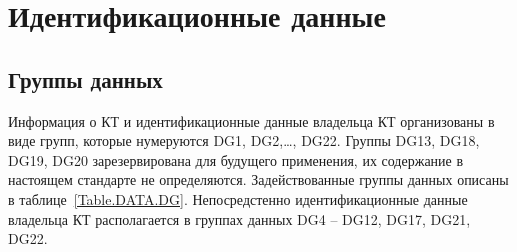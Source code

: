 \chapter{Идентификационные данные}\label{DATA}

\section{Группы данных}\label{DATA.DG}

Информация о КТ и идентификационные данные владельца КТ организованы в виде групп, 
которые нумеруются DG1, DG2,\ldots, DG22. 
Группы DG13, DG18, DG19, DG20 зарезервирована для будущего 
применения, их содержание в настоящем стандарте не определяются. 
Задействованные группы данных описаны в таблице~\ref{Table.DATA.DG}. 
Непосредстенно идентификационные данные владельца КТ располагается 
в группах данных DG4 -- DG12, DG17, DG21, DG22. 

